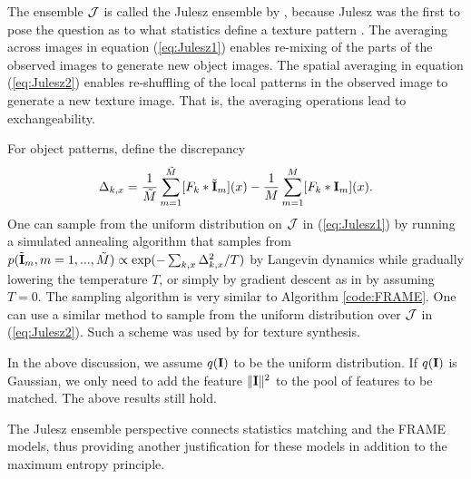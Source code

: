 \documentclass[letterpaper]{article}
\def\I{{\bf I}}
\def\tI{\tilde{\bf I}}
\begin{document}
The ensemble ${\cal J}$ is called the Julesz ensemble by \cite{wu2000texture}, because Julesz  was the first to pose the question as to what statistics define a texture pattern \citep{Julesz1962}. The averaging across images in equation (\ref{eq:Julesz1}) enables re-mixing of  the parts of the observed images to generate new object images.  The spatial averaging in equation (\ref{eq:Julesz2}) enables  re-shuffling of the local patterns in the observed image to generate a new texture image. That is, the averaging operations lead to exchangeability. 

For object patterns, define the discrepancy 
\begin{eqnarray}
\Delta_{k, x} =  \frac{1}{\tilde{M}} \sum_{m=1}^{\tilde{M}} [F_k *\tI_m](x) - \frac{1}{M} \sum_{m=1}^{M} [F_k *\I_m](x).
\end{eqnarray}
One can sample from the uniform distribution on ${\cal J}$ in (\ref{eq:Julesz1}) by running a simulated annealing algorithm that samples from $p(\tilde{\I}_m, m = 1, ..., \tilde{M}) \propto \exp(-\sum_{k, x} \Delta_{k, x}^2/T)$ by Langevin dynamics while gradually lowering the temperature $T$, or simply by gradient descent as in \cite{German2015a} by assuming $T = 0$. The sampling algorithm is very similar to Algorithm \ref{code:FRAME}.  One can use a similar method to sample from the uniform distribution over ${\cal J}$ in (\ref{eq:Julesz2}).  Such a scheme was used by \cite{zhu2000texture} for texture synthesis. 

In the above discussion, we assume $q(\I)$ to be the uniform distribution. If $q(\I)$ is Gaussian, we only need to add the feature $\|\I\|^2$ to the pool of features to be matched. The above results still hold. 

The Julesz ensemble perspective connects statistics matching and the FRAME models, thus providing another justification for these models in addition to the maximum entropy principle. 
 




  
\end{document}
